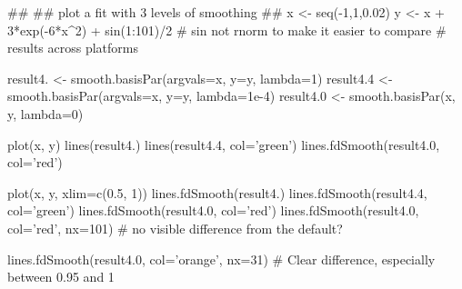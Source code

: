 \begin{Examples}
\begin{ExampleCode}
##
## plot a fit with 3 levels of smoothing
##
x <- seq(-1,1,0.02)
y <- x + 3*exp(-6*x^2) + sin(1:101)/2
# sin not rnorm to make it easier to compare
# results across platforms 

result4. <- smooth.basisPar(argvals=x, y=y, lambda=1)
result4.4 <- smooth.basisPar(argvals=x, y=y, lambda=1e-4)
result4.0 <- smooth.basisPar(x, y, lambda=0)

plot(x, y)
lines(result4.)
lines(result4.4, col='green')
lines.fdSmooth(result4.0, col='red') 

plot(x, y, xlim=c(0.5, 1))
lines.fdSmooth(result4.)
lines.fdSmooth(result4.4, col='green')
lines.fdSmooth(result4.0, col='red')  
lines.fdSmooth(result4.0, col='red', nx=101)
# no visible difference from the default?  

lines.fdSmooth(result4.0, col='orange', nx=31)
# Clear difference, especially between 0.95 and 1  

\end{ExampleCode}
\end{Examples}

